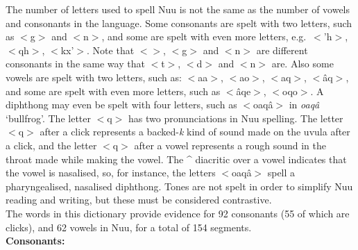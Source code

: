 The number of letters used to spell N\textipa{\textvertline}uu is not
the same as the number of vowels and consonants in the language. Some
consonants are spelt with two letters, such as
$<$g\textipa{\textdoublevertline}$>$ and
$<$n\textipa{\textdoublevertline}$>$, and some are spelt with even
more letters, e.g.\ $<$\textipa{\textdoublevertline}'h$>$,
$<$\textipa{\textdoublevertline}qh$>$, $<$kx'$>$. Note that
$<$\textipa{\textdoublevertline}$>$,
$<$g\textipa{\textdoublevertline}$>$ and
$<$n\textipa{\textdoublevertline}$>$ are different consonants in the
same way that $<$t$>$, $<$d$>$ and $<$n$>$ are. Also some vowels are
spelt with two letters, such as: $<$aa$>$, $<$ao$>$, $<$aq$>$,
$<$\^{a}q$>$, and some are spelt with even more letters, such as
$<$\^{a}qe$>$, $<$oqo$>$. A diphthong may even be spelt with four
letters, such as $<$oaq\^{a}$>$ in
\emph{\textipa{\textdoublevertline}oaq\^{a}} `bullfrog'. The letter
$<$q$>$ has two pronunciations in N\textipa{\textvertline}uu spelling.
The letter $<$q$>$ after a click represents a backed-\emph{k} kind of
sound made on the uvula after a click, and the letter $<$q$>$ after a
vowel represents a rough sound in the throat made while making the
vowel. The \^{ } diacritic over a vowel indicates that the vowel is
nasalised, so, for instance, the letters $<$oaq\^{a}$>$ spell a
pharyngealised, nasalised diphthong. Tones are not spelt in order to
simplify N\textipa{\textvertline}uu reading and writing, but these
must be considered contrastive.\\

The words in this dictionary provide evidence for 92 consonants (55 of
which are clicks), and 62 vowels in N\textipa{\textvertline}uu, for a
total of 154 segments.\\

\textbf{Consonants:}

